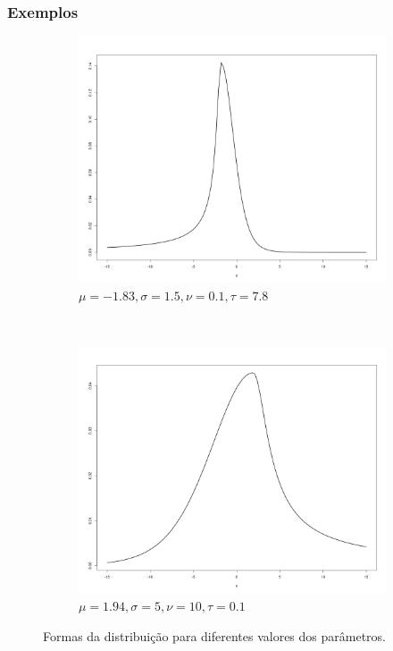 \documentclass[13pt, aspectratio=169]{beamer}
\begin{document}
\begin{frame}
    \frametitle{Exemplos}

    \begin{figure}[!ht]
        \centering
        \begin{subfigure}[t]{0.43\textwidth}
            \centering
            \includegraphics[width=\textwidth]{images/dist_1.png}
            \caption{$\mu = -1.83, \sigma = 1.5, \nu = 0.1, \tau = 7.8$}
        \end{subfigure}%
        ~
        \begin{subfigure}[t]{0.43\textwidth}
            \centering
            \includegraphics[width=\textwidth]{images/dist_2.png}
            \caption{$\mu = 1.94, \sigma = 5, \nu = 10, \tau = 0.1$}
        \end{subfigure}%
        \caption{Formas da distribuição para diferentes valores dos parâmetros.}
    \end{figure}
\end{frame}
\end{document}
